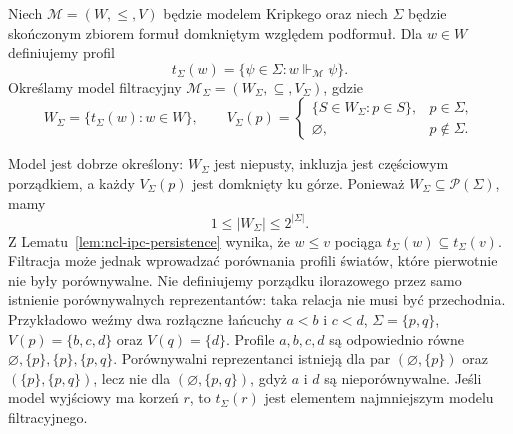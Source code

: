 \begin{definicja}
\label{def:ncl-ipc-filtration}
Niech $\mathcal M=(W,\leq,V)$ będzie modelem Kripkego
oraz niech $\Sigma$ będzie skończonym zbiorem formuł
domkniętym względem podformuł.
Dla $w\in W$ definiujemy profil
\[
 t_\Sigma(w)=\{\psi\in\Sigma:w\Vdash_{\mathcal M}\psi\}.
\]
Określamy model filtracyjny
$\mathcal M_\Sigma=(W_\Sigma,\subseteq,V_\Sigma)$,
gdzie
\[
 W_\Sigma=\{t_\Sigma(w):w\in W\},\qquad
 V_\Sigma(p)=
 \begin{cases}
  \{S\in W_\Sigma:p\in S\},&p\in\Sigma,\\
  \varnothing,&p\notin\Sigma.
 \end{cases}
\]
\end{definicja}
Model jest dobrze określony: $W_\Sigma$ jest niepusty,
inkluzja jest częściowym porządkiem, a każdy
$V_\Sigma(p)$ jest domknięty ku górze.
Ponieważ $W_\Sigma\subseteq\mathcal P(\Sigma)$,
mamy
\[
 1\leq |W_\Sigma|\leq 2^{|\Sigma|}.
\]
Z Lematu~\ref{lem:ncl-ipc-persistence} wynika, że
$w\leq v$ pociąga $t_\Sigma(w)\subseteq t_\Sigma(v)$.
Filtracja może jednak wprowadzać porównania profili
światów, które pierwotnie nie były porównywalne.
Nie definiujemy porządku ilorazowego przez samo
istnienie porównywalnych reprezentantów: taka
relacja nie musi być przechodnia. Przykładowo
weźmy dwa rozłączne łańcuchy $a<b$ i $c<d$,
$\Sigma=\{p,q\}$, $V(p)=\{b,c,d\}$ oraz $V(q)=\{d\}$.
Profile $a,b,c,d$ są odpowiednio równe
$\varnothing,\{p\},\{p\},\{p,q\}$.
Porównywalni reprezentanci istnieją dla par
$(\varnothing,\{p\})$ oraz $(\{p\},\{p,q\})$,
lecz nie dla $(\varnothing,\{p,q\})$,
gdyż $a$ i $d$ są nieporównywalne.
Jeśli model wyjściowy ma korzeń $r$, to
$t_\Sigma(r)$ jest elementem najmniejszym modelu
filtracyjnego.

